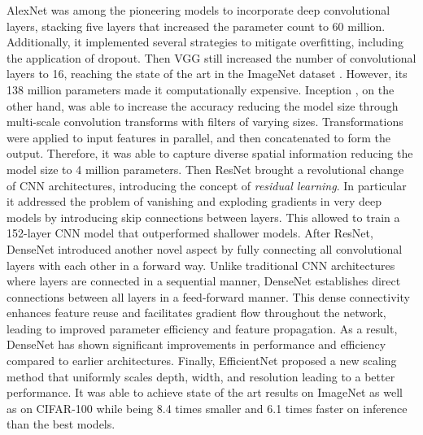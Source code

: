 AlexNet \cite{alexnet} was among the pioneering models to incorporate deep convolutional 
layers, stacking five layers that increased the parameter count to 60 million. 
Additionally, it implemented several strategies to mitigate overfitting, 
including the application of dropout. 
Then VGG \cite{vggnet} still increased the number of 
convolutional layers to 16, reaching the state of the art in the ImageNet 
dataset \cite{imagenet}. However, its 138 million parameters made it 
computationally expensive.
Inception \cite{inception}, on the other hand, was able to increase 
the accuracy reducing the model size through multi-scale convolution transforms 
with filters of varying sizes. Transformations were applied to input features 
in parallel, and then concatenated to form the output.
Therefore, it was able to capture diverse spatial information reducing the 
model size to 4 million parameters.
Then ResNet \cite{resnet} brought a revolutional change of CNN architectures, introducing 
the concept of \textit{residual learning}. In particular it addressed the 
problem of vanishing and exploding gradients in very deep models by introducing 
skip connections between layers. This allowed to train a 152-layer CNN model 
that outperformed shallower models.
After ResNet, DenseNet \cite{densenet} introduced another novel aspect by fully connecting 
all convolutional layers with each other in a forward way. 
Unlike traditional CNN architectures where layers are connected in a sequential 
manner, DenseNet establishes direct connections between all layers in a 
feed-forward manner. This dense connectivity enhances feature reuse and 
facilitates gradient flow throughout the network, leading to improved 
parameter efficiency and feature propagation. As a result, DenseNet has shown 
significant improvements in performance and efficiency compared to earlier 
architectures.
Finally, EfficientNet \cite{efficientnet} proposed a new scaling method that uniformly scales 
depth, width, and resolution leading to a better performance. It was able to 
achieve state of the art results on ImageNet as well as on CIFAR-100 while 
being 8.4 times smaller and 6.1 times faster on inference than the best models.

